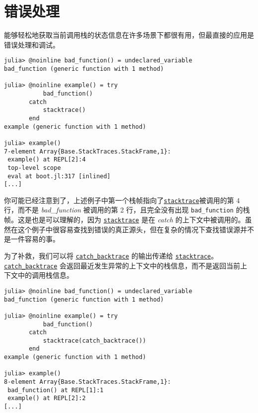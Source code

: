 \hypertarget{6556726272179975372}{}


\section{错误处理}



能够轻松地获取当前调用栈的状态信息在许多场景下都很有用，但最直接的应用是错误处理和调试。




\begin{verbatim}
julia> @noinline bad_function() = undeclared_variable
bad_function (generic function with 1 method)

julia> @noinline example() = try
           bad_function()
       catch
           stacktrace()
       end
example (generic function with 1 method)

julia> example()
7-element Array{Base.StackTraces.StackFrame,1}:
 example() at REPL[2]:4
 top-level scope
 eval at boot.jl:317 [inlined]
[...]
\end{verbatim}



你可能已经注意到了，上述例子中第一个栈帧指向了\hyperlink{11964270650763140298}{\texttt{stacktrace}}被调用的第 4 行，而不是 \emph{bad\_function} 被调用的第 2 行，且完全没有出现 \texttt{bad\_function} 的栈帧。这是也是可以理解的，因为 \hyperlink{11964270650763140298}{\texttt{stacktrace}} 是在 \emph{catch} 的上下文中被调用的。虽然在这个例子中很容易查找到错误的真正源头，但在复杂的情况下查找错误源并不是一件容易的事。



为了补救，我们可以将 \hyperlink{98342946516168163}{\texttt{catch\_backtrace}} 的输出传递给 \hyperlink{11964270650763140298}{\texttt{stacktrace}}。\hyperlink{98342946516168163}{\texttt{catch\_backtrace}} 会返回最近发生异常的上下文中的栈信息，而不是返回当前上下文中的调用栈信息。




\begin{verbatim}
julia> @noinline bad_function() = undeclared_variable
bad_function (generic function with 1 method)

julia> @noinline example() = try
           bad_function()
       catch
           stacktrace(catch_backtrace())
       end
example (generic function with 1 method)

julia> example()
8-element Array{Base.StackTraces.StackFrame,1}:
 bad_function() at REPL[1]:1
 example() at REPL[2]:2
[...]
\end{verbatim}



